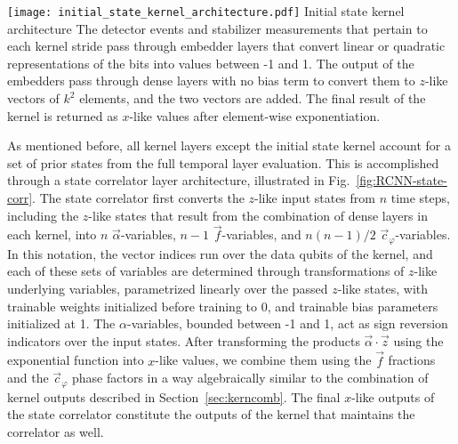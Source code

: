 \begin{figure*}[htb]
\centering
\texttt{[image: initial\_state\_kernel\_architecture.pdf]}
\ccaption
{Initial state kernel architecture}
{
The detector events and stabilizer measurements that pertain to each kernel stride pass through embedder layers that convert linear or quadratic representations of the bits into values between -1 and 1.
The output of the embedders pass through dense layers with no bias term to convert them to $z$-like vectors of $k^2$ elements, and the two vectors are added. The final result of the kernel is returned as $x$-like values after element-wise exponentiation.
}
\label{fig:RCNN-init-arch}
\end{figure*}

As mentioned before, all kernel layers except the initial state kernel account for a set of prior states from the full temporal layer evaluation. This is accomplished through a state correlator layer architecture, illustrated in Fig.~\ref{fig:RCNN-state-corr}. The state correlator first converts the $z$-like input states from $n$ time steps, including the $z$-like states that result from the combination of dense layers in each kernel, into $n$ $\vec{\alpha}$-variables, $n-1$ $\vec{f}$-variables, and $n(n-1)/2$ $\vec{c}_\varphi$-variables. 
In this notation, the vector indices run over the data qubits of the kernel, and each of these sets of variables are determined through transformations of $z$-like underlying variables, parametrized linearly over the passed $z$-like states, with trainable weights initialized before training to 0, and trainable bias parameters initialized at 1. 
The $\alpha$-variables, bounded between -1 and 1, act as sign reversion indicators over the input states. 
After transforming the products $\vec{\alpha} \cdot \vec{z}$ using the exponential function into $x$-like values, we combine them using the $\vec{f}$ fractions and the $\vec{c}_\varphi$ phase factors in a way algebraically similar to the combination of kernel outputs described in Section~\ref{sec:kerncomb}. The final $x$-like outputs of the state correlator constitute the outputs of the kernel that maintains the correlator as well.


